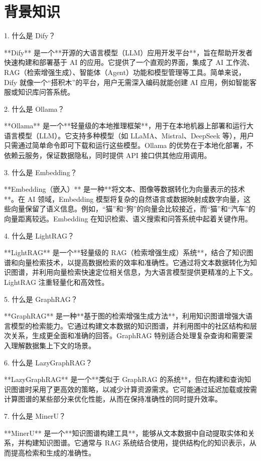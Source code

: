 \chapter{背景知识}

1. 什么是 Dify？

**Dify** 是一个**开源的大语言模型（LLM）应用开发平台**，旨在帮助开发者快速构建和部署基于 AI 的应用。它提供了一个直观的界面，集成了 AI 工作流、RAG（检索增强生成）、智能体（Agent）功能和模型管理等工具。简单来说，Dify 就像一个“搭积木”的平台，用户无需深入编码就能创建 AI 应用，例如智能客服或知识库问答系统。

 2. 什么是 Ollama？
 
**Ollama** 是一个**轻量级的本地推理框架**，用于在本地机器上部署和运行大语言模型（LLM）。它支持多种模型（如 LLaMA、Mistral、DeepSeek 等），用户只需通过简单命令即可下载和运行这些模型。Ollama 的优势在于本地化部署，不依赖云服务，保证数据隐私，同时提供 API 接口供其他应用调用。

 3. 什么是 Embedding？
 
**Embedding（嵌入）** 是一种**将文本、图像等数据转化为向量表示的技术**。在 AI 领域，Embedding 模型将复杂的自然语言或数据映射成数字向量，这些向量保留了语义信息。例如，“猫”和“狗”的向量会比较接近，而“猫”和“汽车”的向量距离较远。Embedding 在知识检索、语义搜索和问答系统中起着关键作用。

4. 什么是 LightRAG？

**LightRAG** 是一个**轻量级的 RAG（检索增强生成）系统**，结合了知识图谱和向量检索技术，以提高数据检索的效率和准确性。它通过将文本数据转化为知识图谱，并利用向量检索快速定位相关信息，为大语言模型提供更精准的上下文。LightRAG 注重轻量化和高效性。

5. 什么是 GraphRAG？

**GraphRAG** 是一种**基于图的检索增强生成方法**，利用知识图谱增强大语言模型的检索能力。它通过构建文本数据的知识图谱，并利用图中的社区结构和层次关系，生成更全面和准确的回答。GraphRAG 特别适合处理复杂查询和需要深入理解数据集上下文的场景。

 6. 什么是 LazyGraphRAG？
 
**LazyGraphRAG** 是一个**类似于 GraphRAG 的系统**，但在构建和查询知识图谱时采用了更高效的策略，以减少计算资源需求。它可能通过延迟加载或按需计算图谱的某些部分来优化性能，从而在保持准确性的同时提升效率。

7. 什么是 MinerU？

**MinerU** 是一个**知识图谱构建工具**，能够从文本数据中自动提取实体和关系，并构建知识图谱。它通常与 RAG 系统结合使用，提供结构化的知识表示，从而提高检索和生成的准确性。

